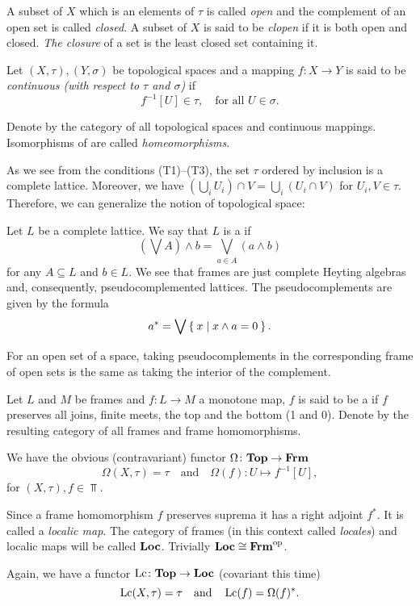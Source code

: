 A subset of $X$ which is an elements of $\tau$ is called \emph{open} and the complement of an open set is called \emph{closed}. A subset of $X$ is said to be \emph{clopen} if it is both open and closed.
\emph{The closure} of a set is the least closed set containing it.

Let $(X,\tau), (Y,\sigma)$ be topological spaces and a mapping $f\colon X\to Y$ is said to be \emph{continuous (with respect to $\tau$ and $\sigma$)} if
$$ f^{-1}[U] \in \tau,\quad\text{for all } U\in \sigma.$$

\noindent Denote by \Top{} the category of all topological spaces and continuous mappings. Isomorphisms of \Top{} are called \emph{homeomorphisms}.

As we see from the conditions (T1)--(T3), the set $\tau$ ordered by inclusion is a complete lattice. Moreover, we have $(\bigcup_i U_i)\cap V = \bigcup_i (U_i\cap V)$ for $U_i, V\in \tau$.
Therefore, we can generalize the notion of topological space:

Let $L$ be a complete lattice. We say that $L$ is a  if
$$ (\bigvee A)\wedge b = \bigvee_{a\in A} ( a\wedge b ) $$
for any $A\subseteq L$ and $b\in L$. We see that frames are just complete Heyting algebras and, consequently, pseudocomplemented lattices.
The pseudocomplements are given by the formula
$$ a^* = \bigvee \Set{ x | x\wedge a = 0}. $$

\noindent For an open set of a space, taking pseudocomplements in the corresponding frame of open sets is the same as taking the interior of the complement.

Let $L$ and $M$ be frames and $f\colon L\to M$ a monotone map, $f$ is said to be a  if $f$ preserves all joins, finite meets, the top and the bottom (1 and 0).
Denote by \Frm{} the resulting category of all frames and frame homomorphisms.

We have the obvious (contravariant) functor $\Omega\colon \mathbf{Top}\to \mathbf{Frm}$
$$ \Omega(X,\tau) = \tau\quad\text{and}\quad \Omega(f)\colon U\mapsto f^{-1}[U],$$
for $(X,\tau), f \in \Top$.

Since a frame homomorphism $f$ preserves suprema it has a right adjoint $f^*$. It is called a \emph{localic map}.
The category of frames (in this context called \emph{locales}) and localic maps will be called $\mathbf{Loc}$. Trivially $\mathbf{Loc}\cong\mathbf{Frm}^{\text{op}}$.

Again, we have a functor $\operatorname{Lc}\colon \mathbf{Top}\to \mathbf{Loc}$ (covariant this time)
$$ \operatorname{Lc}(X,\tau) = \tau\quad\text{and}\quad \operatorname{Lc}(f) = \Omega(f)^*.$$


